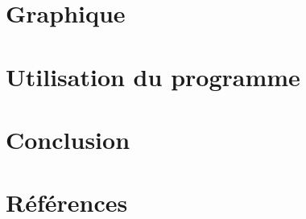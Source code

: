 \documentclass[a4paper,11pt]{article}
\begin{document}
\section{Graphique} %

\section{Utilisation du programme} %

\section{Conclusion} %


\section{Références}
\end{document}
